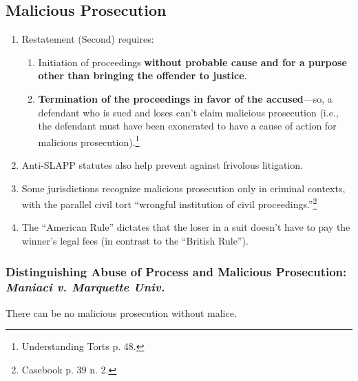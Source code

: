 \subsection{Malicious Prosecution}

\begin{enumerate}
    \item Restatement (Second) requires:
    \begin{enumerate}
        \item Initiation of proceedings \textbf{without probable cause and for a 
        purpose other than bringing the offender to justice}.
        \item \textbf{Termination of the proceedings in favor of the 
        accused}---so, a defendant who is sued and loses can't claim malicious 
        prosecution (i.e., the defendant must have been exonerated to have a 
        cause of action for malicious prosecution).\footnote{Understanding 
        Torts p. 48.}
    \end{enumerate}
    \item Anti-SLAPP statutes also help prevent against frivolous litigation.
    \item Some jurisdictions recognize malicious prosecution only in criminal 
    contexts, with the parallel civil tort ``wrongful institution of civil 
    proceedings.''\footnote{Casebook p. 39 n. 2.}
    \item The ``American Rule'' dictates that the loser in a suit doesn't have 
    to pay the winner's legal fees (in contrast to the ``British Rule'').
\end{enumerate}

\subsubsection{Distinguishing Abuse of Process and Malicious Prosecution: 
\emph{Maniaci v. Marquette Univ.}}

There can be no malicious prosecution without malice.

